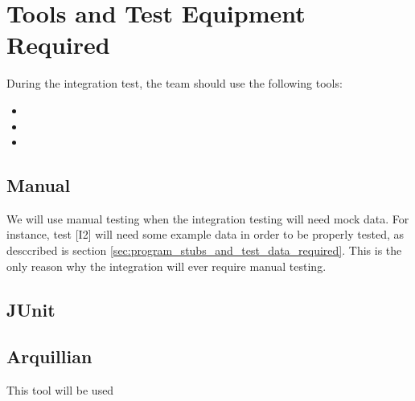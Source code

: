 \section{Tools and Test Equipment Required} %
\label{sec:tools_and_test_equipment_required}

During the integration test, the team should use the following tools:
\begin{itemize}
	\item {}
	\item {}
	\item {}
\end{itemize}

\subsection{Manual} %
\label{sub:manual}

We will use manual testing when the integration testing will need mock data.
For instance, test [I2] will need some example data in order to be properly tested, as desccribed is section \ref{sec:program_stubs_and_test_data_required}.
This is the only reason why the integration will ever require manual testing.

\subsection{JUnit} %
\label{sub:junit}




\subsection{Arquillian} %
\label{sub:arquillian}
 This tool will be used 


